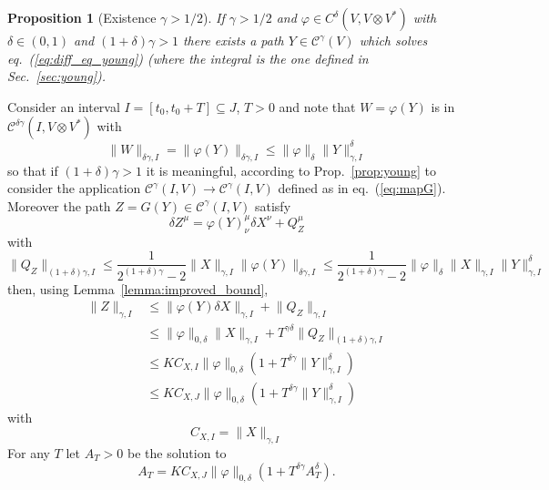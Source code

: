 \documentclass[a4paper,12pt,reqno]{amsproc}
\newcommand{\der}{\delta\!}
\newcommand{\CC}{\mathcal{C}}
\newcommand{\norm}[1]{\lVert #1\rVert}
\newtheorem{proposition}{Proposition}
\begin{document}
\begin{proposition}[Existence $\gamma > 1/2$]
\label{eq:existence_young} If $\gamma > 1/2$ and $\varphi \in
C^\delta(V,V\otimes V^*)$ with $\delta \in (0,1)$ and $(1+\delta)\gamma > 1$ 
there exists a path $Y \in
\CC^\gamma(V)$ which solves eq.~(\ref{eq:diff_eq_young}) (where the
integral is the one defined in Sec.~\ref{sec:young}).    
\end{proposition}
\proof
Consider an interval $I=[t_0,t_0+T] \subseteq J$, $T>0$ and
note that $W = \varphi(Y)$ is  in $\CC^{\delta\gamma}(I,V\otimes
V^*)$ with
$$
\norm{W}_{\delta\gamma,I}= \norm{\varphi(Y)}_{\delta\gamma,I} \le \norm{\varphi}_{\delta}\norm{Y}_{\gamma,I}^\delta
$$
so that if $(1+\delta)\gamma > 1 $ it is meaningful, according to
Prop.~\ref{prop:young} to consider the application
$\CC^{\gamma}(I,V) \to \CC^{\gamma}(I,V)$ defined as in
eq.~(\ref{eq:mapG}). Moreover the path $Z = G(Y) \in \CC^\gamma(I,V)$
satisfy
\begin{equation*}
\der Z^\mu = \varphi(Y)^{\mu}_{\nu} \der X^\nu + Q^\mu_Z
\end{equation*}
with
$$
\norm{Q_Z}_{(1+\delta)\gamma,I} \le \frac{1}{2^{(1+\delta)\gamma}-2} \norm{X}_{\gamma,I}
\norm{\varphi(Y)}_{\delta \gamma,I} \le  \frac{1}{2^{(1+\delta)\gamma}-2} \norm{\varphi}_{\delta}  \norm{X}_{\gamma,I}\norm{Y}_{\gamma,I}^\delta
$$
then, using Lemma~\ref{lemma:improved_bound},
\begin{equation*}
  \begin{split}
\norm{Z}_{\gamma,I} & \le \norm{\varphi(Y) \der X}_{\gamma,I} + \norm{Q_Z}_{\gamma,I}
\\ & \le \norm{\varphi}_{0,\delta} \norm{X}_{\gamma,I} +
T^{\gamma\delta} \norm{Q_Z}_{(1+\delta)\gamma,I}
\\ & \le K C_{X,I} \norm{\varphi}_{0,\delta} (1+T^{\delta
  \gamma}\norm{Y}^\delta_{\gamma,I}) 
\\ & \le K C_{X,J} \norm{\varphi}_{0,\delta} (1+T^{\delta
  \gamma}\norm{Y}^\delta_{\gamma,I}) 
  \end{split}
\end{equation*}
with
$$
C_{X,I} = \norm{X}_{\gamma,I}
$$
For any $T$ let $A_T > 0$ be the solution to
\begin{equation}
  \label{eq:eqA}
 A_T = K C_{X,J} \norm{\varphi}_{0,\delta} (1+T^{\delta
  \gamma}A_T^\delta).
\end{equation}
\end{document}
